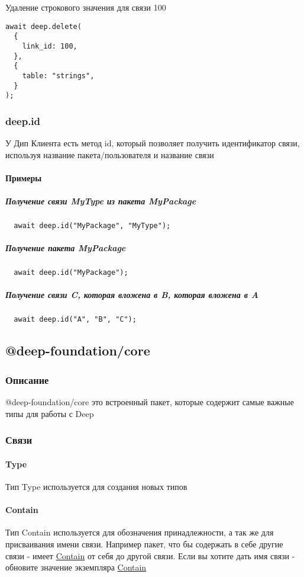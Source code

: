 \documentclass{article}
\begin{document}
Удаление строкового значения для связи 100
\begin{lstlisting}
await deep.delete(
  {
    link_id: 100,
  },
  {
    table: "strings",
  }
);
\end{lstlisting}

\subsubsection{deep.id}
У Дип Клиента есть метод id, который позволяет получить идентификатор связи,
используя название пакета/пользователя и название связи
\paragraph{Примеры}
\subparagraph{Получение связи MyType из пакета MyPackage}
\begin{lstlisting}
  await deep.id("MyPackage", "MyType");
\end{lstlisting}

\subparagraph{Получение пакета MyPackage}
\begin{lstlisting}
  await deep.id("MyPackage");
\end{lstlisting}

\subparagraph{Получение связи C, которая вложена в B, которая вложена в A}
\begin{lstlisting}
  await deep.id("A", "B", "C");
\end{lstlisting}

\subsection{@deep-foundation/core}
\subsubsection{Описание}
@deep-foundation/core\hypertarget{core.Def}{} это встроенный пакет, которые
содержит самые важные типы для работы с Deep
\subsubsection{Связи}
\paragraph*{Type}
Тип Type\hypertarget{type.Def}{} используется для создания новых типов
\paragraph*{Contain}
Тип Contain\hypertarget{Contain.Def}{} используется для обозначения
принадлежности, а так же для присваивания имени связи. Например пакет, что бы
содержать в себе другие связи - имеет \hyperlink{Contain.Def}{Contain} от себя
до другой связи. Если вы хотите дать имя связи - обновите значение экземпляра
\hyperlink{Contain.Def}{Contain}
\end{document}
